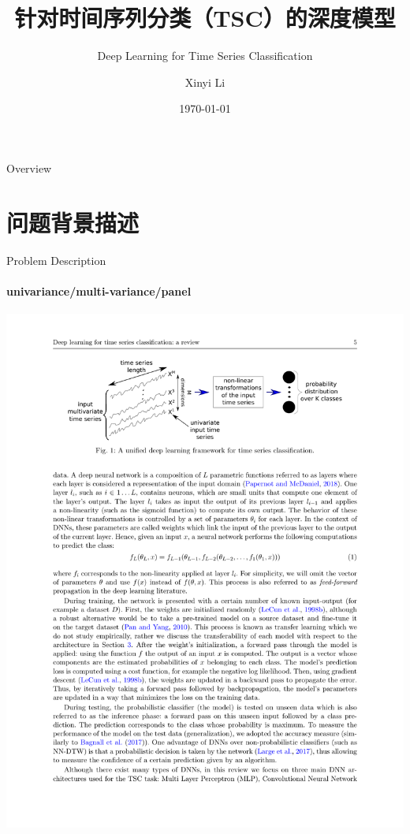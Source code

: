 \documentclass[aspectratio=169]{ctexbeamer}
\title{针对时间序列分类（TSC）的深度模型}
\subtitle{Deep Learning for Time Series Classification \footfullcite{fawaz2019deep}}
\author{Xinyi Li}
\date{\today}
\begin{document}
\begin{frame}
	\titlepage
\end{frame}

\begin{frame}{Overview}
  \tableofcontents
\end{frame}

\section{问题背景描述}

\begin{frame}{Problem Description}
	\framesubtitle{univariance/multi-variance/panel}
	\begin{center}
		\includegraphics[width=\textwidth]{figure/base_formula}
	\end{center}
\end{frame}
\end{document}
